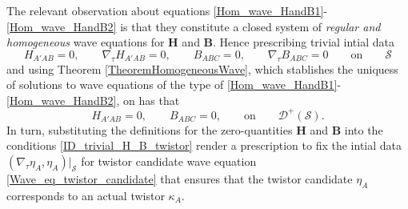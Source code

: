 \documentclass[10pt,a4paper]{article}
\theoremstyle{plain}
\def\bmB{{\bm B}}
\def\bmH{{\bm H}}
\begin{document}
{The relevant observation about equations
\eqref{Hom_wave_HandB1}-\eqref{Hom_wave_HandB2} is that they
constitute a closed system of \emph{regular and homogeneous}
wave equations for $\bmH$ and $\bmB$.
Hence prescribing trivial intial data
\[
H_{A'AB}=0, \qquad \nabla_\tau H_{A'AB}=0, \qquad B_{ABC}=0, \qquad \nabla_\tau B_{ABC}=0 \qquad \text{on} \qquad \mathcal{S}
\]
and using Theorem \ref{TheoremHomogeneousWave}, which stablishes the
uniquess of solutions to wave equations of the type
of \eqref{Hom_wave_HandB1}-\eqref{Hom_wave_HandB2}, on has that 
\begin{equation}\label{ID_trivial_H_B_twistor}
H_{A'AB}=0, \qquad B_{ABC}=0, \qquad \text{on} \qquad \mathcal{D}^{+}(\mathcal{S}) .
\end{equation}
In turn, substituting the definitions for the zero-quantities $\bmH$
and $\bmB$ into the conditions \eqref{ID_trivial_H_B_twistor} render a
prescription to fix the intial data $(\nabla_\tau \eta_A,
\eta_A)|_\mathcal{S}$ for  twistor
candidate wave equation \eqref{Wave_eq_twistor_candidate} that ensures that
the twistor candidate $\eta_A$ corresponds to an actual twistor $\kappa_A$.

}
\end{document}
